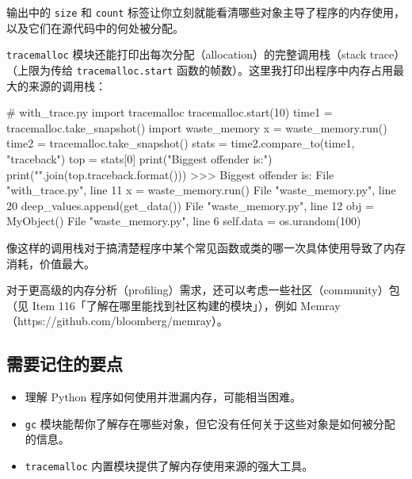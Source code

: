输出中的 \texttt{size} 和 \texttt{count} 标签让你立刻就能看清哪些对象主导了程序的内存使用，以及它们在源代码中的何处被分配。

\texttt{tracemalloc} 模块还能打印出每次分配（allocation）的完整调用栈（stack trace）（上限为传给 \texttt{tracemalloc.start} 函数的帧数）。这里我打印出程序中内存占用最大的来源的调用栈：

\begin{codebox}[python]
# with_trace.py
import tracemalloc
tracemalloc.start(10)
time1 = tracemalloc.take_snapshot()
import waste_memory
x = waste_memory.run()
time2 = tracemalloc.take_snapshot()
stats = time2.compare_to(time1, "traceback")
top = stats[0]
print("Biggest offender is:")
print("\n".join(top.traceback.format()))
>>>
Biggest offender is:
  File "with_trace.py", line 11
    x = waste_memory.run()
  File "waste_memory.py", line 20
    deep_values.append(get_data())
  File "waste_memory.py", line 12
    obj = MyObject()
  File "waste_memory.py", line 6
    self.data = os.urandom(100)
\end{codebox}

像这样的调用栈对于搞清楚程序中某个常见函数或类的哪一次具体使用导致了内存消耗，价值最大。

对于更高级的内存分析（profiling）需求，还可以考虑一些社区（community）包（见 Item 116「了解在哪里能找到社区构建的模块」），例如 Memray（https://github.com/bloomberg/memray）。

\subsection{需要记住的要点}

\begin{itemize}
\item 理解 Python 程序如何使用并泄漏内存，可能相当困难。
\item \texttt{gc} 模块能帮你了解存在哪些对象，但它没有任何关于这些对象是如何被分配的信息。
\item \texttt{tracemalloc} 内置模块提供了解内存使用来源的强大工具。
\end{itemize}
